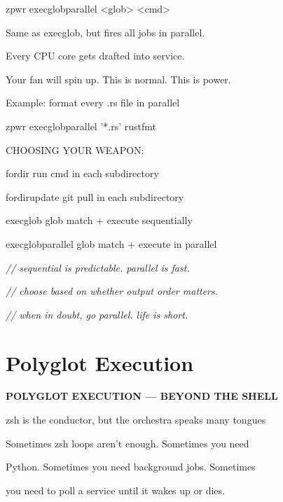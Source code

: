 \documentclass[11pt,a4paper,twoside]{book}
\begin{document}
\begin{codebox}
zpwr execglobparallel <glob> <cmd>\\
\end{codebox}

Same as execglob, but fires all jobs in parallel.

Every CPU core gets drafted into service.

Your fan will spin up. This is normal. This is power.

Example: format every .rs file in parallel

\begin{codebox}
zpwr execglobparallel '*.rs' rustfmt\\
\end{codebox}

CHOOSING YOUR WEAPON:

fordir             run cmd in each subdirectory

\begin{codebox}
fordirupdate       git pull in each subdirectory\\
\end{codebox}

execglob           glob match + execute sequentially

execglobparallel   glob match + execute in parallel

{\small\itshape\color{dimtext} // sequential is predictable. parallel is fast.}

{\small\itshape\color{dimtext} // choose based on whether output order matters.}

{\small\itshape\color{dimtext} // when in doubt, go parallel. life is short.}


\vspace{16pt}

\section{Polyglot Execution}


\vspace{10pt}
{\large\bfseries\color{neoncyan} POLYGLOT EXECUTION — BEYOND THE SHELL}\vspace{6pt}

zsh is the conductor, but the orchestra speaks many tongues

Sometimes zsh loops aren't enough. Sometimes you need

Python. Sometimes you need background jobs. Sometimes

you need to poll a service until it wakes up or dies.
\end{document}
